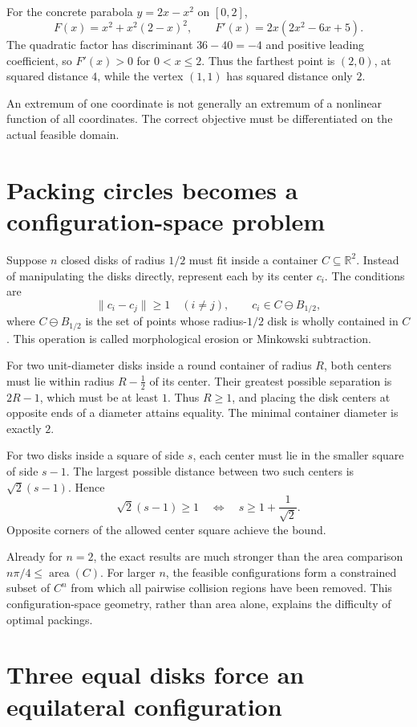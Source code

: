 For the concrete parabola \(y=2x-x^2\) on \([0,2]\),
\[
 F(x)=x^2+x^2(2-x)^2,\qquad
 F'(x)=2x(2x^2-6x+5).
\]
The quadratic factor has discriminant \(36-40=-4\) and positive leading coefficient, so \(F'(x)>0\) for \(0<x\le2\). Thus the farthest point is \((2,0)\), at squared distance \(4\), while the vertex \((1,1)\) has squared distance only \(2\).

An extremum of one coordinate is not generally an extremum of a nonlinear function of all coordinates. The correct objective must be differentiated on the actual feasible domain.

\section{Packing circles becomes a configuration-space problem}

Suppose \(n\) closed disks of radius \(1/2\) must fit inside a container \(C\subseteq\mathbb R^2\). Instead of manipulating the disks directly, represent each by its center \(c_i\). The conditions are
\[
 \|c_i-c_j\|\ge1\quad(i\ne j),\qquad
 c_i\in C\ominus B_{1/2},
\]
where \(C\ominus B_{1/2}\) is the set of points whose radius-\(1/2\) disk is wholly contained in \(C\). This operation is called morphological erosion or Minkowski subtraction.

For two unit-diameter disks inside a round container of radius \(R\), both centers must lie within radius \(R-\tfrac12\) of its center. Their greatest possible separation is \(2R-1\), which must be at least \(1\). Thus \(R\ge1\), and placing the disk centers at opposite ends of a diameter attains equality. The minimal container diameter is exactly \(2\).

For two disks inside a square of side \(s\), each center must lie in the smaller square of side \(s-1\). The largest possible distance between two such centers is \(\sqrt2(s-1)\). Hence
\[
 \sqrt2(s-1)\ge1
 \quad\Longleftrightarrow\quad
 \boxed{s\ge1+\frac1{\sqrt2}.}
\]
Opposite corners of the allowed center square achieve the bound.

Already for \(n=2\), the exact results are much stronger than the area comparison \(n\pi/4\le\operatorname{area}(C)\). For larger \(n\), the feasible configurations form a constrained subset of \(C^n\) from which all pairwise collision regions have been removed. This configuration-space geometry, rather than area alone, explains the difficulty of optimal packings.

\section{Three equal disks force an equilateral configuration}

